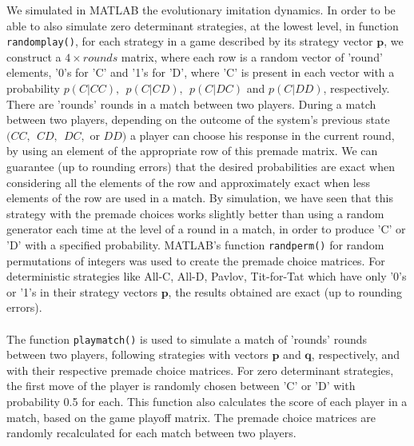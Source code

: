 \documentclass[12pt]{article}
\begin{document}
We simulated in MATLAB the evolutionary imitation dynamics. In order to be able to also simulate zero determinant strategies, at the lowest level, in function \texttt{randomplay()}, for each strategy in a game described by its strategy vector $\mathbf{p}$, we construct a $4\times rounds$ matrix, where each row is a random vector of 'round' elements, '0's for 'C' and '1's for 'D', where 'C' is present in each vector with a probability $p(C|CC),\ \ p(C|CD),\ \ p(C|DC)$ and $p(C|DD)$, respectively. There are 'rounds' rounds in a match between two players. During a match between two players, depending on the outcome of the system's previous state $(CC,\ \ CD,\ \ DC,$ or $DD)$ a player can choose his response in the current round, by using an element  of the appropriate row of this premade matrix. We can guarantee (up to rounding errors) that the desired probabilities are exact when considering all the elements of the row and approximately exact when less elements of the row are used in a match. By simulation, we have seen that this strategy with the premade choices works slightly better than using a random generator each time at the level of a round in a match, in order to produce 'C' or 'D' with a specified probability. MATLAB's function \texttt{randperm()} for random permutations of integers was used to create the premade choice matrices. For deterministic strategies like All-C, All-D, Pavlov, Tit-for-Tat which have only '0's or '1's in their strategy vectors $\mathbf{p}$, the results obtained are exact (up to rounding errors).
\\\\
The function \texttt{playmatch()} is used to simulate a match of 'rounds' rounds between two players, following strategies with vectors $\mathbf{p}$ and $\mathbf{q}$, respectively, and with their respective premade choice matrices. For zero determinant strategies, the first move of the player is randomly chosen between 'C' or 'D' with probability 0.5 for each. This function also calculates the score of each player in a match, based on the game playoff matrix. The premade choice matrices are randomly recalculated for each match between two players.
\\\\
\end{document}
